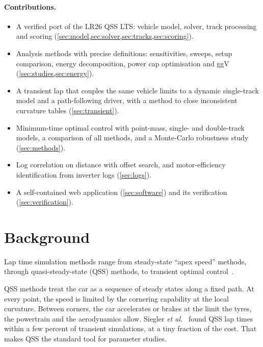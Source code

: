 \documentclass[11pt]{article}
\begin{document}
\paragraph{Contributions.}
\begin{itemize}
  \item A verified port of the LR26 QSS LTS: vehicle model, solver, track processing and scoring
        (\cref{sec:model,sec:solver,sec:tracks,sec:scoring}).
  \item Analysis methods with precise definitions: sensitivities, sweeps, setup comparison, energy decomposition,
        power cap optimisation and ggV (\cref{sec:studies,sec:energy}).
  \item A transient lap that couples the same vehicle limits to a dynamic single-track model and a
        path-following driver, with a method to close inconsistent curvature tables (\cref{sec:transient}).
  \item Minimum-time optimal control with point-mass, single- and double-track models, a comparison of all
        methods, and a Monte-Carlo robustness study (\cref{sec:methods}).
  \item Log correlation on distance with offset search, and motor-efficiency identification from inverter logs
        (\cref{sec:logs}).
  \item A self-contained web application (\cref{sec:software}) and its verification (\cref{sec:verification}).
\end{itemize}

\section{Background}\label{sec:background}
Lap time simulation methods range from steady-state ``apex speed'' methods, through quasi-steady-state (QSS)
methods, to transient optimal control~\cite{siegler2000,brayshaw2005,casanova2000}.

QSS methods treat the car as a sequence of steady states along a fixed path. At every point, the speed is limited
by the cornering capability at the local curvature. Between corners, the car accelerates or brakes at the limit
the tyres, the powertrain and the aerodynamics allow. Siegler \emph{et al.}~\cite{siegler2000} found QSS lap times
within a few percent of transient simulations, at a tiny fraction of the cost. That makes QSS the standard tool for
parameter studies.
\end{document}
